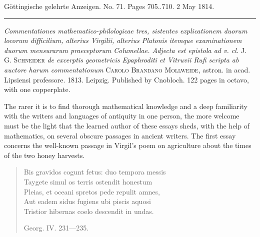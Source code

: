 \clearpage
{}
\hypertarget{native-572-lower}{}
\begin{center}\small Göttingische gelehrte Anzeigen. No. 71. Pages 705..710. 2 May 1814.\\[3pt]\rule{.72\linewidth}{.3pt}\end{center}

\emph{Commentationes mathematico-philologicae tres, sistentes explicationem duorum locorum difficilium, alterius Virgilii, alterius Platonis itemque examinationem duorum mensurarum praeceptorum Columellae. Adjecta est epistola ad v. cl.} J. G. \textsc{Schneider} \emph{de excerptis geometricis Epaphroditi et Vitruvii Rufi scripta ab auctore harum commentationum} \textsc{Carolo Brandano Mollweide}, astron. in acad. Lipsiensi professore. 1813. Leipzig. Published by Cnobloch. 122 pages in octavo, with one copperplate.

The rarer it is to find thorough mathematical knowledge and a deep familiarity with the writers and languages of antiquity in one person, the more welcome must be the light that the learned author of these essays sheds, with the help of mathematics, on several obscure passages in ancient writers. The first essay concerns the well-known passage in Virgil’s poem on agriculture about the times of the two honey harvests.

\begin{quote}\small Bis gravidos cogunt fetus: duo tempora messis \\ Taygete simul os terris ostendit honestum \\ Pleias, et oceani spretos pede repulit amnes, \\ Aut eadem sidus fugiens ubi piscis aquosi \\ Tristior hibernas coelo descendit in undas.

\hfill Georg. IV. 231---235. \end{quote}

